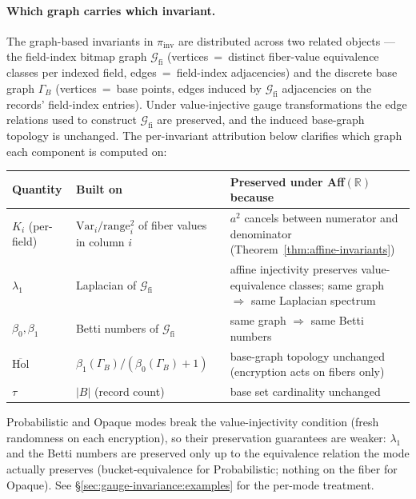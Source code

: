 \documentclass[11pt,letterpaper]{article}
\begin{document}
\paragraph{Which graph carries which invariant.}
The graph-based invariants in $\pi_{\mathrm{inv}}$ are distributed
across two related objects --- the field-index bitmap graph
$\mathcal{G}_{\mathrm{fi}}$ (vertices~=~distinct fiber-value
equivalence classes per indexed field, edges~=~field-index
adjacencies) and the discrete base graph $\Gamma_{\!B}$
(vertices~=~base points, edges induced by
$\mathcal{G}_{\mathrm{fi}}$ adjacencies on the records'
field-index entries). Under value-injective gauge transformations
the edge relations used to construct $\mathcal{G}_{\mathrm{fi}}$
are preserved, and the induced base-graph topology is unchanged.
The per-invariant attribution below clarifies which graph each
component is computed on:

\begin{center}
\small
\begin{tabular}{p{2.3cm}p{4.0cm}p{6.5cm}}
\toprule
\textbf{Quantity} & \textbf{Built on} & \textbf{Preserved under Aff$(\mathbb{R})$ because} \\
\midrule
$K_i$ (per-field) & $\mathrm{Var}_i / \mathrm{range}_i^2$ of fiber values in column $i$ & $a^2$ cancels between numerator and denominator (Theorem~\ref{thm:affine-invariants}) \\
\addlinespace
$\lambda_1$ & Laplacian of $\mathcal{G}_{\mathrm{fi}}$ & affine injectivity preserves value-equivalence classes; same graph $\Rightarrow$ same Laplacian spectrum \\
\addlinespace
$\beta_0, \beta_1$ & Betti numbers of $\mathcal{G}_{\mathrm{fi}}$ & same graph $\Rightarrow$ same Betti numbers \\
\addlinespace
$\overline{\mathrm{Hol}}$ & $\beta_1(\Gamma_{\!B}) / (\beta_0(\Gamma_{\!B}) + 1)$ & base-graph topology unchanged (encryption acts on fibers only) \\
\addlinespace
$\tau$ & $|B|$ (record count) & base set cardinality unchanged \\
\bottomrule
\end{tabular}
\end{center}

Probabilistic and Opaque modes break the value-injectivity
condition (fresh randomness on each encryption), so their
preservation guarantees are weaker: $\lambda_1$ and the Betti
numbers are preserved only up to the equivalence relation the
mode actually preserves (bucket-equivalence for Probabilistic;
nothing on the fiber for Opaque). See \S\ref{sec:gauge-invariance:examples}
for the per-mode treatment.
\end{document}
